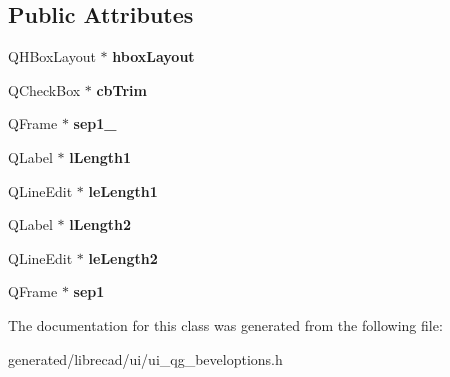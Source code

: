 \subsection*{Public Attributes}
\begin{DoxyCompactItemize}
\item 
\hypertarget{classUi__QG__BevelOptions_a6dae71c8a33b83393c3ad41eb0ad5576}{Q\-H\-Box\-Layout $\ast$ {\bfseries hbox\-Layout}}\label{classUi__QG__BevelOptions_a6dae71c8a33b83393c3ad41eb0ad5576}

\item 
\hypertarget{classUi__QG__BevelOptions_ac58d9c9fadd4dff9134e0eba291f9f24}{Q\-Check\-Box $\ast$ {\bfseries cb\-Trim}}\label{classUi__QG__BevelOptions_ac58d9c9fadd4dff9134e0eba291f9f24}

\item 
\hypertarget{classUi__QG__BevelOptions_a111d804006887d7e77222744bc9a10d3}{Q\-Frame $\ast$ {\bfseries sep1\-\_}}\label{classUi__QG__BevelOptions_a111d804006887d7e77222744bc9a10d3}

\item 
\hypertarget{classUi__QG__BevelOptions_a58bca96040f9715b0976fd14ea40bd14}{Q\-Label $\ast$ {\bfseries l\-Length1}}\label{classUi__QG__BevelOptions_a58bca96040f9715b0976fd14ea40bd14}

\item 
\hypertarget{classUi__QG__BevelOptions_ab333768448bd4fe091647ad2bc9e3108}{Q\-Line\-Edit $\ast$ {\bfseries le\-Length1}}\label{classUi__QG__BevelOptions_ab333768448bd4fe091647ad2bc9e3108}

\item 
\hypertarget{classUi__QG__BevelOptions_adaefd346609042f72688b76428fd2f7f}{Q\-Label $\ast$ {\bfseries l\-Length2}}\label{classUi__QG__BevelOptions_adaefd346609042f72688b76428fd2f7f}

\item 
\hypertarget{classUi__QG__BevelOptions_a972fe3a7a5a5cb2721ccdb2ab491ffb1}{Q\-Line\-Edit $\ast$ {\bfseries le\-Length2}}\label{classUi__QG__BevelOptions_a972fe3a7a5a5cb2721ccdb2ab491ffb1}

\item 
\hypertarget{classUi__QG__BevelOptions_afb049492dbedba7a9a7e8504f3d76019}{Q\-Frame $\ast$ {\bfseries sep1}}\label{classUi__QG__BevelOptions_afb049492dbedba7a9a7e8504f3d76019}

\end{DoxyCompactItemize}


The documentation for this class was generated from the following file\-:\begin{DoxyCompactItemize}
\item 
generated/librecad/ui/ui\-\_\-qg\-\_\-beveloptions.\-h\end{DoxyCompactItemize}
